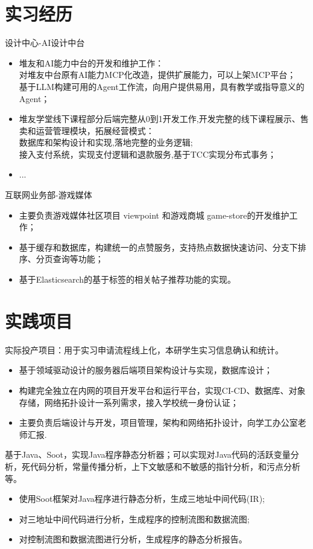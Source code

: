 \documentclass{resume}
\begin{document}
\section{实习经历}
\Content
{{设计中心-AI设计中台}}
{
    \begin{itemize}
        \item 堆友和AI能力中台的开发和维护工作：\\ 对堆友中台原有AI能力MCP化改造，提供扩展能力，可以上架MCP平台；\\ 基于LLM构建可用的Agent工作流，向用户提供易用，具有教学或指导意义的Agent；
        \item 堆友学堂线下课程部分后端完整从0到1开发工作,开发完整的线下课程展示、售卖和运营管理模块，拓展经营模式：\\
        数据库和架构设计和实现,落地完整的业务逻辑;\\
        接入支付系统，实现支付逻辑和退款服务,基于TCC实现分布式事务；
        \item ...
    \end{itemize}
}
\Content
{{互联网业务部-游戏媒体}}
{
    \begin{itemize}
        \item 主要负责游戏媒体社区项目 viewpoint 和游戏商城 game-store的开发维护工作；
        \item 基于缓存和数据库，构建统一的点赞服务，支持热点数据快速访问、分支下排序、分页查询等功能；
        \item 基于Elasticsearch的基于标签的相关帖子推荐功能的实现。
    \end{itemize}
}

\section{实践项目}
\Contents
{实际投产项目：用于实习申请流程线上化，本研学生实习信息确认和统计。}
{\begin{itemize}
    \item 基于领域驱动设计的服务器后端项目架构设计与实现，数据库设计；
    \item 构建完全独立在内网的项目开发平台和运行平台，实现CI-CD、数据库、对象存储，网络拓扑设计一系列需求，接入学校统一身份认证；
    \item 主要负责后端设计与开发，项目管理，架构和网络拓扑设计，向学工办公室老师汇报.
\end{itemize}
}

\Contents
{基于Java、Soot，实现Java程序静态分析器；可以实现对Java代码的活跃变量分析，死代码分析，常量传播分析，上下文敏感和不敏感的指针分析，和污点分析等。}
{\begin{itemize}
    \item 使用Soot框架对Java程序进行静态分析，生成三地址中间代码(IR);
    \item 对三地址中间代码进行分析，生成程序的控制流图和数据流图;
    \item 对控制流图和数据流图进行分析，生成程序的静态分析报告。
\end{itemize} }
\end{document}
